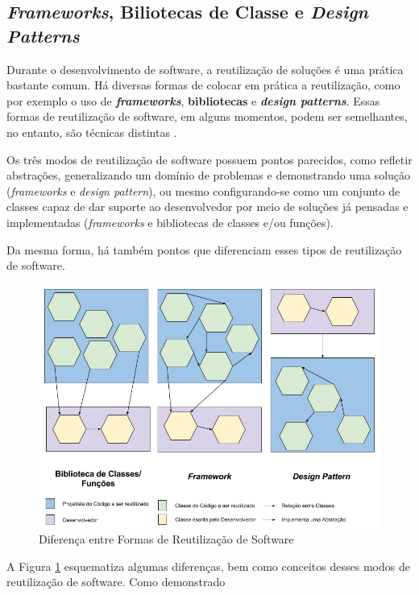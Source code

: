 \subsection{\textit{Frameworks}, Biliotecas de Classe e \textit{Design Patterns}}
Durante o desenvolvimento de software, a reutilização de soluções é uma prática
bastante comum. Há diversas formas de colocar em prática a reutilização, como
por exemplo o uso de \textbf{\textit{frameworks}}, \textbf{bibliotecas} e
\textbf{\textit{design patterns}}. Essas formas de reutilização de software, em
alguns momentos, podem ser semelhantes, no entanto, são técnicas distintas
\cite{barretoJunior2006}.
\par
\indent Os três modos de reutilização de software possuem pontos parecidos,
como refletir abstrações, generalizando um domínio de problemas e demonstrando
uma solução (\textit{frameworks} e \textit{design pattern}), ou mesmo
configurando-se como um conjunto de classes capaz de dar suporte ao
desenvolvedor por meio de soluções já pensadas e implementadas
(\textit{frameworks} e bibliotecas de classes e/ou funções).
\par
\indent Da mesma forma, há também pontos que diferenciam esses tipos de
reutilização de software.
  \begin{figure}[h]
    \centering
    \includegraphics[width=\textwidth]{figuras/bibFrameworkDesignPattern.png}
    \caption{Diferença entre Formas de Reutilização de Software}
    \label{fig:bibFrameworkPattern}
  \end{figure}
\par
\indent A Figura \ref{fig:bibFrameworkPattern} esquematiza algumas diferenças,
bem como conceitos desses modos de reutilização de software. Como demonstrado
